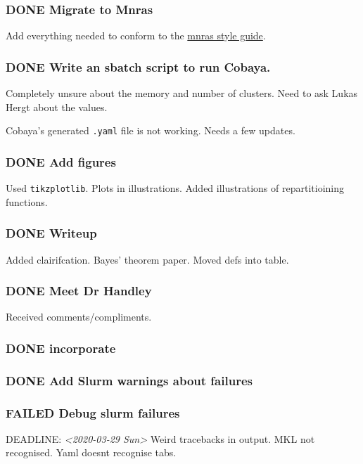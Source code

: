 \documentclass[11pt]{article}
\begin{document}
\subsubsection{{\bfseries\sffamily DONE} Migrate to Mnras}
\label{sec:orgdbb267e}
Add everything needed to conform to the \href{https://academic.oup.com/mnras/pages/general\_instructions}{mnras style guide}. 
\subsubsection{{\bfseries\sffamily DONE} Write an sbatch script to run Cobaya.}
\label{sec:orgfb804d8}
Completely unsure about the memory and number of clusters. Need to
ask Lukas Hergt about the values. 

Cobaya's generated \texttt{.yaml} file is not working. Needs a few updates. 
\subsubsection{{\bfseries\sffamily DONE} Add figures}
\label{sec:orgc939853}
Used \texttt{tikzplotlib}. Plots in illustrations. Added illustrations of
repartitioining functions.



\subsubsection{{\bfseries\sffamily DONE} Writeup}
\label{sec:org64436eb}
Added clairifcation. Bayes' theorem paper. Moved defs into table. 

\subsubsection{{\bfseries\sffamily DONE} Meet Dr Handley}
\label{sec:org36ac320}
Received comments/compliments. 

\subsubsection{{\bfseries\sffamily DONE} incorporate}
\label{sec:orgd15aff9}
\subsubsection{{\bfseries\sffamily DONE} Add Slurm warnings about failures}
\label{sec:org84ec2f3}

\subsubsection{FAILED Debug slurm failures}
\label{sec:orgf584f75}
DEADLINE: \textit{<2020-03-29 Sun> } 
Weird tracebacks in output. 
MKL not recognised. 
Yaml doesnt recognise tabs. 
\end{document}
